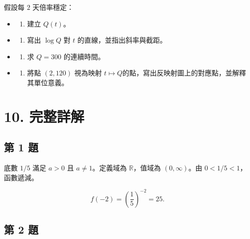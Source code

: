 \documentclass[11pt,a4paper]{article}
\providecommand{\tightlist}{%
  \setlength{\itemsep}{0pt}\setlength{\parskip}{0pt}}
\begin{document}
\begin{enumerate}
  假設每 \(2\) 天倍率穩定：

  \begin{itemize}
  \tightlist
  \item
    \begin{enumerate}
    \def\labelenumii{(\alph{enumii})}
    \tightlist
    \item
      建立 \(Q(t)\)。
    \end{enumerate}
  \item
    \begin{enumerate}
    \def\labelenumii{(\alph{enumii})}
    \setcounter{enumii}{1}
    \tightlist
    \item
      寫出 \(\log Q\) 對 \(t\) 的直線，並指出斜率與截距。
    \end{enumerate}
  \item
    \begin{enumerate}
    \def\labelenumii{(\alph{enumii})}
    \setcounter{enumii}{2}
    \tightlist
    \item
      求 \(Q=300\) 的連續時間。
    \end{enumerate}
  \item
    \begin{enumerate}
    \def\labelenumii{(\alph{enumii})}
    \setcounter{enumii}{3}
    \tightlist
    \item
      將點 \((2,120)\) 視為映射 \(t\mapsto Q\)的點，寫出反映射圖上的對應點，並解釋其單位意義。
    \end{enumerate}
  \end{itemize}
\end{enumerate}

\section{10. 完整詳解}\label{ux5b8cux6574ux8a73ux89e3}

\subsection{第 1 題}\label{ux7b2c-1-ux984c}

底數 \(1/5\) 滿足 \(a>0\) 且 \(a\ne1\)。定義域為 \(\mathbb R\)，值域為 \((0,\infty)\)。由 \(0<1/5<1\)，函數遞減。

\[
f(-2)=\left(\frac15\right)^{-2}=25.
\]

\subsection{第 2 題}\label{ux7b2c-2-ux984c}
\end{document}
